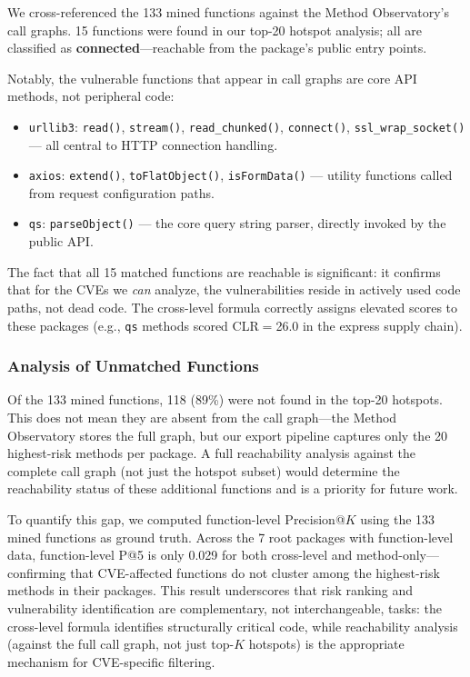 \documentclass[conference]{IEEEtran}
\begin{document}
We cross-referenced the 133 mined functions against the Method Observatory's call graphs. 15 functions were found in our top-20 hotspot analysis; all are classified as \textbf{connected}---reachable from the package's public entry points.

Notably, the vulnerable functions that appear in call graphs are core API methods, not peripheral code:

\begin{itemize}
    \item \texttt{urllib3}: \texttt{read()}, \texttt{stream()}, \texttt{read\_chunked()}, \texttt{connect()}, \texttt{ssl\_wrap\_socket()} --- all central to HTTP connection handling.
    \item \texttt{axios}: \texttt{extend()}, \texttt{toFlatObject()}, \texttt{isFormData()} --- utility functions called from request configuration paths.
    \item \texttt{qs}: \texttt{parseObject()} --- the core query string parser, directly invoked by the public API.
\end{itemize}

The fact that all 15 matched functions are reachable is significant: it confirms that for the CVEs we \emph{can} analyze, the vulnerabilities reside in actively used code paths, not dead code. The cross-level formula correctly assigns elevated scores to these packages (e.g., \texttt{qs} methods scored CLR$=$26.0 in the express supply chain).

\subsubsection{Analysis of Unmatched Functions}

Of the 133 mined functions, 118 (89\%) were not found in the top-20 hotspots. This does not mean they are absent from the call graph---the Method Observatory stores the full graph, but our export pipeline captures only the 20 highest-risk methods per package. A full reachability analysis against the complete call graph (not just the hotspot subset) would determine the reachability status of these additional functions and is a priority for future work.

To quantify this gap, we computed function-level Precision@$K$ using the 133 mined functions as ground truth. Across the 7 root packages with function-level data, function-level P@5 is only 0.029 for both cross-level and method-only---confirming that CVE-affected functions do not cluster among the highest-risk methods in their packages. This result underscores that risk ranking and vulnerability identification are complementary, not interchangeable, tasks: the cross-level formula identifies structurally critical code, while reachability analysis (against the full call graph, not just top-$K$ hotspots) is the appropriate mechanism for CVE-specific filtering.
\end{document}
